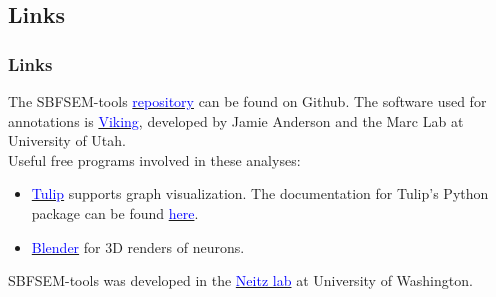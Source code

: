\documentclass[11pt]{beamer}
\begin{document}
\subsection*{Links}
\begin{frame}
	\frametitle{Links}
	The SBFSEM-tools \href{www.github.com/sarastokes/sbfsem-tools}{\textcolor{blue}{repository}} can be found on Github.
	\vskip10pt
	The software used for annotations is \href{https://connectomes.utah.edu/}{\textcolor{blue}{Viking}}, developed by Jamie Anderson and the Marc Lab at University of Utah.\\
	Useful free programs involved in these analyses:
	\begin{itemize}
		\item \href{http://chip.de/downloads/Tulip-64-Bit_41528289.html}{\textcolor{blue}{Tulip}} supports graph visualization. The documentation for Tulip's Python package can be found \href{http://tulip.labri.fr/Documentation/4_10_0/tulip-python/html/index.html}{\textcolor{blue}{here}}.
		\item \href{http://www.blender.com}{\textcolor{blue}{Blender}} for 3D renders of neurons.
	\end{itemize}
	SBFSEM-tools was developed in the \href{http://www.neitzvision.com/}{\textcolor{blue}{Neitz lab}} at University of Washington.
\end{frame}	
\end{document}
